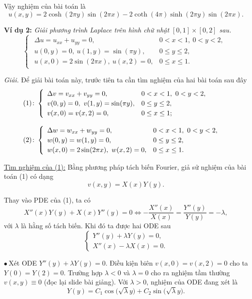 \documentclass[10pt, a4paper]{article}
\begin{document}
	Vậy nghiệm của bài toán là $$u(x,y)=2\cosh(2\pi y)\sin(2\pi x)-2\coth(4\pi)\sinh(2\pi y)\sin(2\pi x).$$
	
	\textbf{Ví dụ 2:} \textit{Giải phương trình Laplace trên hình chữ nhật $[0,1]\times[0,2]$ sau.} $$\begin{cases}
		\begin{array}{ll}
			\Delta u=u_{xx}+u_{yy}=0, & 0<x<1,~0<y<2,\\
			u(0,y)=0,~u(1,y)=\sin(\pi y), & 0\le y\le 2,\\
			u(x,0)=2\sin(2\pi x),~u(x,2)=0, & 0\le x\le 1.
		\end{array}
	\end{cases}$$
	
	\textit{Giải.} Để giải bài toán này, trước tiên ta cần tìm nghiệm của hai bài toán sau đây \begin{align*}
		&(1)\colon\begin{cases}
			\begin{array}{ll}
				\Delta v=v_{xx}+v_{yy}=0, & 0<x<1,~0<y<2,\\
				v(0,y)=0,~v(1,y)=\sin(\pi y), & 0\le y\le 2,\\
				v(x,0)=v(x,2)=0, & 0\le x\le 1;
			\end{array}
		\end{cases}\\
		\noalign{\vskip7pt}
		&(2)\colon\begin{cases}
			\begin{array}{ll}
				\Delta w=w_{xx}+w_{yy}=0, & 0<x<1,~0<y<2,\\
				w(0,y)=w(1,y)=0, & 0\le y\le 2,\\
				w(x,0)=2\sin(2\pi x),~w(x,2)=0, & 0\le x\le 1.
			\end{array}
		\end{cases}
	\end{align*}
	
	\underline{Tìm nghiệm của (1):} Bằng phương pháp tách biến Fourier, giả sử nghiệm của bài toán (1) có dạng $$v(x,y)=X(x)Y(y).$$
	
	Thay vào PDE của (1), ta có $$X''(x)Y(y)+X(x)Y''(y)=0\iff-\frac{X''(x)}{X(x)}=\frac{Y''(y)}{Y(y)}=-\lambda,$$
	với $\lambda$ là hằng số tách biến. Khi đó ta được hai ODE sau $$\begin{cases}
		Y''(y)+\lambda Y(y)=0,\\
		X''(x)-\lambda X(x)=0.
	\end{cases}$$
	
	$\bullet~$Xét ODE $Y''(y)+\lambda Y(y)=0$. Điều kiện biên $v(x,0)=v(x,2)=0$ cho ta $Y(0)=Y(2)=0$. Trường hợp $\lambda<0$ và $\lambda=0$ cho ra nghiệm tầm thường $v(x,y)\equiv0$ (đọc lại slide bài giảng). Với $\lambda>0$, nghiệm của ODE đang xét là $$Y(y)=C_1\cos\big(\sqrt\lambda y\big)+C_2\sin\big(\sqrt\lambda y\big).$$
	
\end{document}
